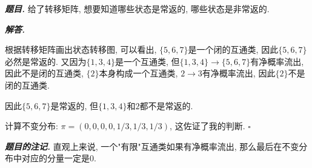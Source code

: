 \documentclass[10pt, a4paper, oneside]{ctexart}
\newenvironment{problem}{\begin{framed}\par\noindent\textbf{\textit{题目. }}}{\end{framed}\par}
\newenvironment{solution}{%
  \par\noindent\textbf{\textit{解答. }}\ignorespaces
}{%
  \hfill\ensuremath{\square}\par %
}
\newenvironment{note}{\par\noindent\textbf{\textit{题目的注记. }}\ignorespaces}{\par}
\begin{document}
\begin{problem}
    给了转移矩阵, 想要知道哪些状态是常返的, 哪些状态是非常返的.
\end{problem}
\begin{solution}
根据转移矩阵画出状态转移图, 可以看出, $\{5,6,7\}$是一个闭的互通类, 因此$\{5,6,7\}$必然是常返的. 又因为$\{1,3,4\}$是一个互通类, 但$\{1,3,4\}\to \{5,6,7\}$有净概率流出, 因此不是闭的互通类, $\{2\}$本身构成一个互通类, $2\to 3$有净概率流出, 因此$\{2\}$不是闭的互通类.

因此$\{5,6,7\}$是常返的, 但$\{1,3,4\}$和$2$都不是常返的.

计算不变分布: $\pi=(0,0,0,0,1/3,1/3,1/3)$, 这佐证了我的判断.
\end{solution}
\begin{note}
    直观上来说, 一个"有限"互通类如果有净概率流出, 那么最后在不变分布中对应的分量一定是$0$.
\end{note}

\begin{comment}
\subsection{极限行为}
\begin{problem}设$\mathbf{P}$不可约,则存在正整数$d$以及$S$的一个分割${D}_{0},{D}_{1},\cdots,{D}_{d - 1}$。（对任何 $n$ 补充定义 ${{D}_{{nd} + r} \mathrel{\text{:=}} {D}_{r}}$ ）,使得:

(1) $\forall r \geq 0,\forall i \in {D}_{r},\forall l \geq 0,{\sum }_{j \in {D}_{r + l}}{p}_{ij}^{\left( l\right) } = 1$ ;

(2) $\forall r \geq 0,\forall i,j \in {D}_{r},\exists {n}_{0} \geq 0$ 使得当 $n \geq {n}_{0}$ 时, ${p}_{ij}^{\left( nd\right) } > 0$ .\\
(提示: 取定 \( k \in S \) ,令 \( {R}_{k} = \{ n : {p}_{kk}^{\left( n\right) } > 0\} ,d = \min \{ n - m : n,m \in \) \( \left. {{R}_{k},n > m}\right) ,{D}_{r} = \left\{ {i \in S : \exists n \geq 0\text{ s.t. }{p}_{ki}^{\left( nd + r\right) } > 0}\right\} \) .)
\end{problem}
\begin{solution}
(1) 按照提示的方法定义$d$和$D_i$. 反证法，假设存在$r_0\geq0$，存在$i_0\in D_{r_0}$，存在$l_0\geq 0$，使得$\sum_{j\in D_{r_0+l_0}p_{i_0,j}^{(l_0)}}<1$. 那么就存在状态$w^*$不属于$D_{r_0+l_0}$，使得从状态$i_0$走$l_0$步之后到达$w^*$，即$p_{i_0,w^*}^{(l_0)}>0$. 因为所有的$D_i$对$S$做了分割，因此$w^*$必然在某一个$D_i,i\neq i_0+l_0$中. 不妨设$r_0=1$，$l_0=1,i=3$，即$i_0\in D_1, l_0=1, \sum_{j\in D_2}p_{i_0,j}^{(1)}<1, w^*\in D_3,p_{i_0,w^*}^{(1)}>0$. 根据$d$的定义，存在$n_0,m_0\in R_{kk},d=n_0-m_0$. 现在，状态$k\in D_0$，可以通过包含$w^*$的路径，走$d-1$步返回$D_0$，这与$d$的定义矛盾.\\
(2) 
\end{solution}
\end{comment}
\end{document}
